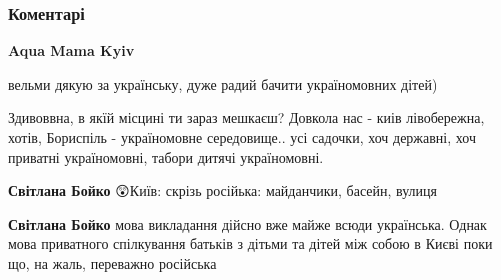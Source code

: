  
 
 
 
 
\subsubsection{Коментарі}

\begin{itemize}
 
\textbf{Aqua Mama Kyiv} 

вельми дякую за українську, дуже радий бачити україномовних дітей)


 

Здивоввна, в якїй місцині ти зараз мешкаєш? Довкола нас - киів лівобережна,
хотів, Бориспіль - україномовне середовище.. усі садочки, хоч державні, хоч
приватні україномовні, табори дитячі україномовні.

\begin{itemize}
 
\textbf{Світлана Бойко} 😲Київ: скрізь російька: майданчики, басейн, вулиця

 
\textbf{Світлана Бойко} мова викладання дійсно вже майже всюди українська. Однак мова приватного спілкування батьків з дітьми та дітей між собою в Києві поки що, на жаль, переважно російська
\end{itemize}


\end{itemize}

